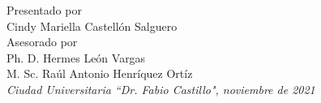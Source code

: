 \begin{titlepage}
\begin{center}
	\vspace{2.0cm}
	\large
	Presentado por\\
	Cindy Mariella Castellón Salguero\\
	
	\vspace{0.5cm}
	Asesorado por\\
	Ph. D. Hermes Le\'on Vargas\\
	M. Sc. Ra\'ul Antonio Henr\'iquez Ort\'iz\\
	
	\vspace{2.0cm}
	\textit{Ciudad Universitaria ``Dr. Fabio Castillo", noviembre de 2021}
	\end{center}
\end{titlepage}